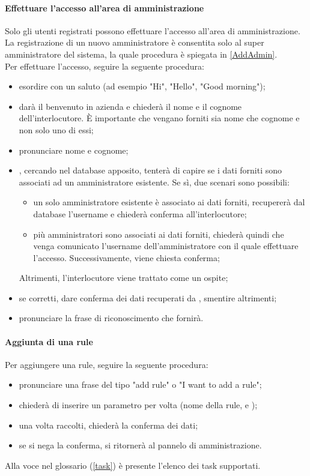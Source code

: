 \paragraph{Effettuare l'accesso all'area di amministrazione}\label{adminArea}
Solo gli utenti registrati possono effettuare l'accesso all'area di amministrazione. La registrazione di un nuovo amministratore è consentita solo al super amministratore del sistema, la quale procedura è spiegata in \ref{AddAdmin}. \\
Per effettuare l'accesso, seguire la seguente procedura:
\begin{itemize}
	\item esordire con un saluto (ad esempio "Hi", "Hello", "Good morning");
	\item \PROGETTO{} darà il benvenuto in azienda e chiederà il nome e il cognome dell'interlocutore. È importante che vengano forniti sia nome che cognome e non solo uno di essi;
	\item pronunciare nome e cognome;
	\item \PROGETTO, cercando nel database apposito, tenterà di capire se i dati forniti sono associati ad un amministratore esistente. Se sì, due scenari sono possibili:
	\begin{itemize}
		\item un solo amministratore esistente è associato ai dati forniti, \PROGETTO{} recupererà dal database l'username e chiederà conferma all'interlocutore;
		\item più amministratori sono associati ai dati forniti, \PROGETTO{} chiederà quindi che venga comunicato l'username dell'amministratore con il quale effettuare l'accesso. Successivamente, viene chiesta conferma; 
	\end{itemize}
	Altrimenti, l'interlocutore viene trattato come un ospite;
	\item se corretti, dare conferma dei dati recuperati da \PROGETTO, smentire altrimenti;
	\item pronunciare la frase di riconoscimento che \PROGETTO{} fornirà.
\end{itemize}
\paragraph{Aggiunta di una rule}
Per aggiungere una rule, seguire la seguente procedura:
\begin{itemize}
	\item pronunciare una frase del tipo "add rule" o "I want to add a rule";
	\item \PROGETTO{} chiederà di inserire un parametro per volta (nome della rule,  e );
	\item una volta raccolti, \PROGETTO{} chiederà la conferma dei dati;
	\item se si nega la conferma, si ritornerà al pannelo di amministrazione.
\end{itemize}
Alla voce  nel glossario (\ref{task}) è presente l'elenco dei task supportati.
